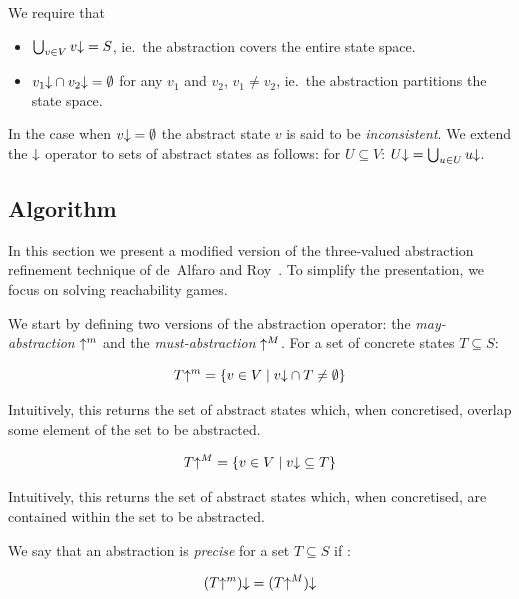 We require that 
\begin{itemize}
    \item $\bigcup_{v\in V}v\mathord{\downarrow} = S$, ie.\ the abstraction covers the entire state space. 
    \item $v_1\mathord{\downarrow}\cap v_2\mathord{\downarrow} = \emptyset$ for any $v_1$ and $v_2$, $v_1 \neq v_2$, ie.\ the abstraction partitions the state space.
\end{itemize}

In the case when $v\mathord{\downarrow} = \emptyset$ the abstract state $v$ is said to be \emph{inconsistent}. We extend the $\mathord{\downarrow}$ operator to sets of abstract states as follows: for $U\subseteq V$: $U\mathord{\downarrow} = \bigcup_{u\in U}u\mathord{\downarrow}$.

\subsection{Algorithm}
\label{sec:threeval_generic}

In this section we present a modified version of the three-valued abstraction refinement technique of de~Alfaro and Roy~\cite{Alfaro_Roy_07}. To simplify the presentation, we focus on solving reachability games. 

We start by defining two versions of the abstraction operator: the \emph{may-abstraction} $\mathord{\uparrow^m}$ and the \emph{must-abstraction} $\mathord{\uparrow^M}$. For a set of concrete states $T \subseteq S$:

\begin{equation}
T\mathord{\uparrow^m} = \{v\in V\mid v\mathord{\downarrow} \cap T \neq \emptyset\} 
\end{equation}

Intuitively, this returns the set of abstract states which, when concretised, overlap some element of the set to be abstracted.

\begin{equation}
T\mathord{\uparrow^M} = \{v\in V\mid v\mathord{\downarrow} \subseteq T \}
\end{equation}

Intuitively, this returns the set of abstract states which, when concretised, are contained within the set to be abstracted.

We say that an abstraction is \emph{precise} for a set $T\subseteq S$ if :

\begin{equation}
(T\mathord{\uparrow^m})\mathord{\downarrow} = (T\mathord{\uparrow^M})\mathord{\downarrow}
\end{equation}

